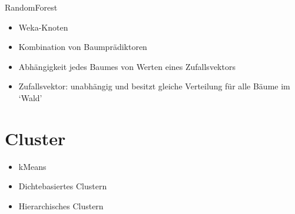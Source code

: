 \documentclass[
	handout,
  	aspectratio=169
]{beamer}
\begin{document}
		\begin{frame}{RandomForest}		
			\begin{itemize}
				\item Weka-Knoten
				\item Kombination von Baumprädiktoren
				\item Abhängigkeit jedes Baumes von Werten eines Zufallsvektors
				\item Zufallsvektor: unabhängig und besitzt gleiche Verteilung für alle Bäume im ‘Wald’
			\end{itemize}	
		\end{frame}
	\section{Cluster}	
	\frame{\sectionpage}		
	\begin{frame}
	\begin{itemize}
	\item kMeans
	\item Dichtebasiertes Clustern
	\item Hierarchisches Clustern
	\end{itemize}
	\end{frame}
	
\end{document}
